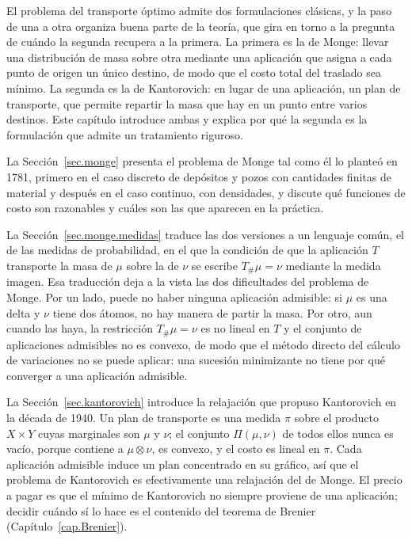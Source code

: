 \documentclass[12pt, a4paper]{amsbook}
\theoremstyle{remark}
\theoremstyle{definition}
\numberwithin{section}{chapter}
\numberwithin{subsection}{section}
\numberwithin{equation}{section}
\numberwithin{figure}{chapter}
\begin{document}
El problema del transporte óptimo admite dos formulaciones clásicas, y la
paso de una a otra organiza buena parte de la teoría, que gira en torno a la
pregunta de cuándo la segunda recupera a la primera. La primera es la de
Monge: llevar una distribución de masa sobre otra mediante una aplicación que
asigna a cada punto de origen un único destino, de modo que el costo total del
traslado sea mínimo. La segunda es la de Kantorovich: en lugar de una
aplicación, un plan de transporte, que permite repartir la masa que hay en un
punto entre varios destinos. Este capítulo introduce ambas y explica por qué la
segunda es la formulación que admite un tratamiento riguroso.

La Sección~\ref{sec.monge} presenta el problema de Monge tal como él lo planteó
en 1781, primero en el caso discreto de depósitos y pozos con cantidades
finitas de material y después en el caso continuo, con densidades, y discute
qué funciones de costo son razonables y cuáles son las que aparecen en la
práctica.

La Sección~\ref{sec.monge.medidas} traduce las dos versiones a un lenguaje
común, el de las medidas de probabilidad, en el que la condición de que la
aplicación $T$ transporte la masa de $\mu$ sobre la de $\nu$ se escribe
$T_\#\mu=\nu$ mediante la medida imagen. Esa traducción deja a la vista las dos
dificultades del problema de Monge. Por un lado, puede no haber ninguna
aplicación admisible: si $\mu$ es una delta y $\nu$ tiene dos átomos, no hay
manera de partir la masa. Por otro, aun cuando las haya, la restricción
$T_\#\mu=\nu$ es no lineal en $T$ y el conjunto de aplicaciones admisibles no es
convexo, de modo que el método directo del cálculo de variaciones no se puede
aplicar: una sucesión minimizante no tiene por qué converger a una aplicación
admisible.

La Sección~\ref{sec.kantorovich} introduce la relajación que propuso
Kantorovich en la década de 1940. Un plan de transporte es una medida $\pi$
sobre el producto $X\times Y$ cuyas marginales son $\mu$ y $\nu$; el conjunto
$\Pi(\mu,\nu)$ de todos ellos nunca es vacío, porque contiene a
$\mu\otimes\nu$, es convexo, y el costo es lineal en $\pi$. Cada aplicación
admisible induce un plan concentrado en su gráfico, así que el problema de
Kantorovich es efectivamente una relajación del de Monge. El precio a pagar es
que el mínimo de Kantorovich no siempre proviene de una aplicación; decidir
cuándo sí lo hace es el contenido del teorema de Brenier
(Capítulo~\ref{cap.Brenier}).
\end{document}
